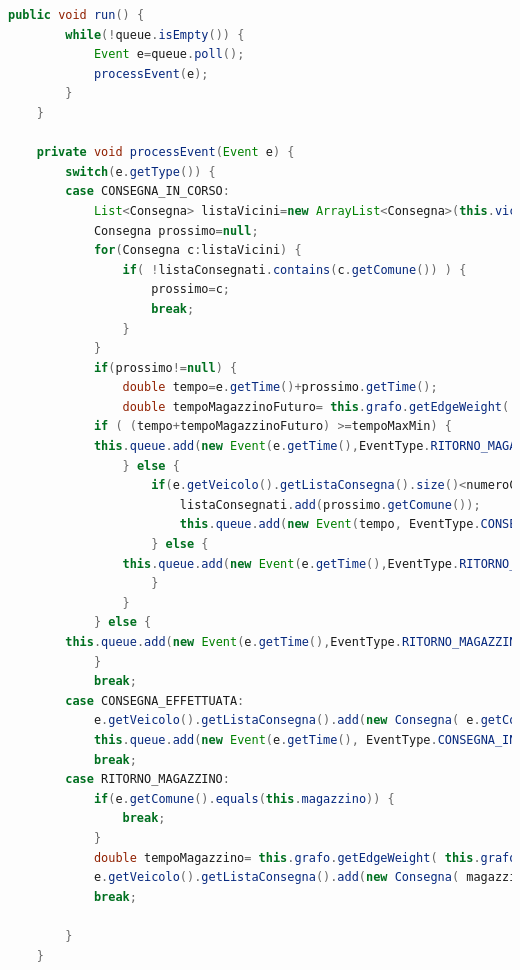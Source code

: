 \documentclass[a4paper,12pt]{report}
\begin{document}
\begin{center}
\begin{lstlisting}[caption={Metodi run() e processEvent() della classe Simulator},  label={lst:runProcess},captionpos=b, language=Java]
public void run() {
		while(!queue.isEmpty()) {
			Event e=queue.poll();
			processEvent(e);
		}
	}
	
	private void processEvent(Event e) {
		switch(e.getType()) {
		case CONSEGNA_IN_CORSO:
			List<Consegna> listaVicini=new ArrayList<Consegna>(this.viciniMigliore(e.getComune()));
			Consegna prossimo=null;
			for(Consegna c:listaVicini) {
				if( !listaConsegnati.contains(c.getComune()) ) {
					prossimo=c;
					break;
				}
			}
			if(prossimo!=null) {
				double tempo=e.getTime()+prossimo.getTime();
				double tempoMagazzinoFuturo= this.grafo.getEdgeWeight( this.grafo.getEdge(prossimo.getComune(), magazzino) ) ;
			if ( (tempo+tempoMagazzinoFuturo) >=tempoMaxMin) {
			this.queue.add(new Event(e.getTime(),EventType.RITORNO_MAGAZZINO,e.getVeicolo(),e.getComune()));
				} else {
					if(e.getVeicolo().getListaConsegna().size()<numeroCons) {
						listaConsegnati.add(prossimo.getComune());
						this.queue.add(new Event(tempo, EventType.CONSEGNA_EFFETTUATA, e.getVeicolo(), prossimo.getComune()) );
					} else {
				this.queue.add(new Event(e.getTime(),EventType.RITORNO_MAGAZZINO,e.getVeicolo(),e.getComune()));
					}
				}
			} else {
		this.queue.add(new Event(e.getTime(),EventType.RITORNO_MAGAZZINO,e.getVeicolo(),e.getComune()));
			}
			break;
		case CONSEGNA_EFFETTUATA:
			e.getVeicolo().getListaConsegna().add(new Consegna( e.getComune(), e.getTime() ));
			this.queue.add(new Event(e.getTime(), EventType.CONSEGNA_IN_CORSO, e.getVeicolo(), e.getComune()) );
			break;
		case RITORNO_MAGAZZINO:
			if(e.getComune().equals(this.magazzino)) {
				break;
			}
			double tempoMagazzino= this.grafo.getEdgeWeight( this.grafo.getEdge(e.getComune(), magazzino) ) ;
			e.getVeicolo().getListaConsegna().add(new Consegna( magazzino, tempoMagazzino+e.getTime() ));
			break;

		}
	}
\end{lstlisting}
\end{center}
\end{document}
